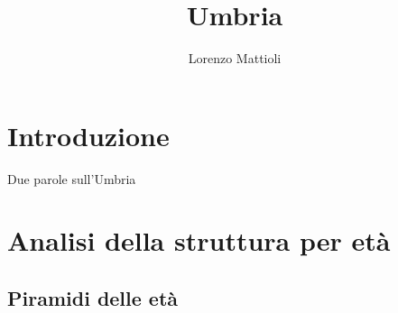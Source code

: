 \documentclass[
]{article}
\title{Umbria}
\author{Lorenzo Mattioli}
\date{}
\renewcommand*\contentsname{Table of contents}
\newcommand\contentsname{Table of contents}
\begin{document}
\maketitle

\renewcommand*\contentsname{Table of contents}
{
\hypersetup{linkcolor=}
\setcounter{tocdepth}{3}
\tableofcontents
}

\section{Introduzione}\label{introduzione}

Due parole sull'Umbria

\section{Analisi della struttura per
età}\label{analisi-della-struttura-per-etuxe0}

\subsection{Piramidi delle età}\label{piramidi-delle-etuxe0}
\end{document}
